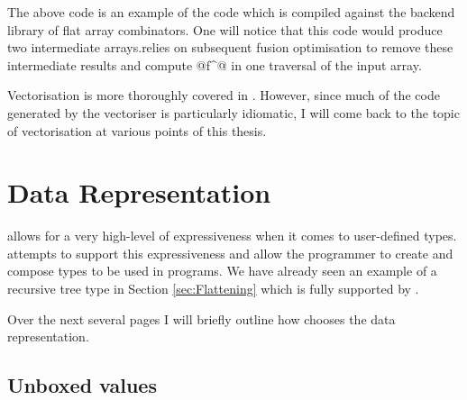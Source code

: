 \documentclass[preamble.tex]{subfiles}
\begin{document}
The above code is an example of the code which is compiled against the backend library of flat array combinators. One will notice that this code would produce two intermediate arrays.\iintermediate \DPH relies on subsequent fusion optimisation to remove these intermediate results and compute @f^@ in one traversal of the input array.




Vectorisation is more thoroughly covered in \cite{PLKC08}. However, since much of the code generated by the vectoriser is particularly idiomatic, I will come back to the topic of vectorisation at various points of this thesis.



\clearpage

\section{Data Representation}
\label{sec:DPH-Data-Representation}

\Haskell allows for a very high-level of expressiveness when it comes to user-defined types. \DPH attempts to support this expressiveness and allow the programmer to create and compose types to be used in \DPH programs. We have already seen an example of a recursive tree type in Section \ref{sec:Flattening} which is fully supported by \DPH.

Over the next several pages I will briefly outline how \DPH chooses the data representation.


\subsection{Unboxed values}
\iboxing
\end{document}
